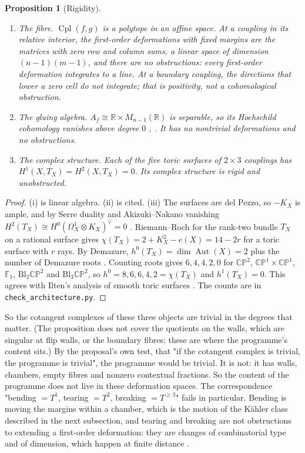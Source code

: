 \documentclass[11pt]{article}
\newtheorem{proposition}[theorem]{Proposition}
\theoremstyle{definition}
\theoremstyle{remark}
\newcommand{\R}{\mathbb{R}}
\newcommand{\Cpl}{\operatorname{Cpl}}
\newcommand{\CP}{\mathbb{CP}}
\begin{document}
\begin{proposition}[Rigidity]\label{prop:rigid}
\leavevmode
\begin{enumerate}[label=(\roman*)]
\item \emph{The fibre.} $\Cpl(f,g)$ is a polytope in an affine space. At a coupling in its relative interior, the first-order deformations
  with fixed margins are the matrices with zero row and column sums, a linear space of dimension $(n-1)(m-1)$, and there are no obstructions:
  every first-order deformation integrates to a line. At a boundary coupling, the directions that lower a zero cell do not integrate; that is
  positivity, not a cohomological obstruction.
\item \emph{The gluing algebra.} $A_f\cong\R\times M_{n-1}(\R)$ is separable, so its Hochschild cohomology vanishes above degree $0$
  \cite[Thm.~2.2]{Algebras}, \cite[Prop.~7.1]{Bridges}. It has no nontrivial deformations and no obstructions.
\item \emph{The complex structure.} Each of the five toric surfaces of $2\times3$ couplings has $H^1(X,T_X)=H^2(X,T_X)=0$. Its complex structure
  is rigid and unobstructed.
\end{enumerate}
\end{proposition}
\begin{proof}
(i) is linear algebra. (ii) is cited. (iii) The surfaces are del Pezzo, so $-K_X$ is ample, and by Serre duality and Akizuki--Nakano vanishing
$H^2(T_X)\cong H^0(\Omega^1_X\otimes K_X)^\vee=0$ \cite{AkizukiNakano1954}. Riemann--Roch for the rank-two bundle $T_X$ on a rational surface
gives $\chi(T_X)=2+K_X^2-e(X)=14-2r$ for a toric surface with $r$ rays. By Demazure, $h^0(T_X)=\dim\operatorname{Aut}(X)=2$ plus the number of
Demazure roots \cite{Demazure1970}. Counting roots gives $6,4,4,2,0$ for $\CP^2$, $\CP^1\times\CP^1$, $\mathbb F_1$, $\mathrm{Bl}_2\CP^2$ and
$\mathrm{Bl}_3\CP^2$, so $h^0=8,6,6,4,2=\chi(T_X)$ and $h^1(T_X)=0$. This agrees with Ilten's analysis of smooth toric surfaces
\cite{Ilten2009}. The counts are in \texttt{check\_architecture.py}.
\end{proof}

So the cotangent complexes of these three objects are trivial in the degrees that matter. (The proposition does not cover the quotients on
the walls, which are singular at flip walls, or the boundary fibres; these are where the programme's content sits.) By the proposal's own test, that "if the cotangent
complex is trivial, the programme is trivial", the programme would be trivial. It is not: it has walls, chambers, empty fibres and
nonzero contextual fractions. So the content of the programme does not live in these deformation spaces. The correspondence "bending $=T^1$,
tearing $=T^2$, breaking $=T^{\ge3}$" fails in particular. Bending is moving the margins within a chamber, which is the motion of the
Kähler class described in the next subsection, and tearing and breaking are not obstructions to extending a first-order deformation: they are changes of combinatorial type and of dimension, which happen at finite
distance \cite[Rem.~3.5]{Bands}.
\end{document}
